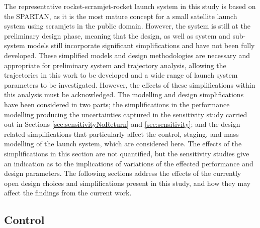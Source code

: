 \noindent
The representative rocket-scramjet-rocket launch system in this study is based on the SPARTAN\cite{Preller2017b}, as it is the most mature concept for a small satellite launch system using scramjets in the public domain. However, the system is still at the preliminary design phase, meaning that the design, as well as system and sub-system models still incorporate significant simplifications and have not been fully developed. These simplified models and design methodologies are necessary and appropriate for preliminary system and trajectory analysis, allowing the trajectories in this work to be developed and a wide range of launch system parameters to be investigated. However, the effects of these simplifications within this analysis must be acknowledged.
The modelling and design simplifications have been considered in two parts; the simplifications in the performance modelling producing the uncertainties captured in the sensitivity study carried out in Sections \ref{sec:sensitivityNoReturn} and \ref{sec:sensitivity}; and the design related simplifications that particularly affect the control, staging, and mass modelling of the launch system, which are considered here. The effects of the simplifications in this section are not quantified, but the sensitivity studies give an indication as to the implications of variations of the effected performance and design parameters.
The following sections address the effects of the currently open design choices and simplifications present in this study, and how they may affect the findings from the current work. 

\subsection{Control}
